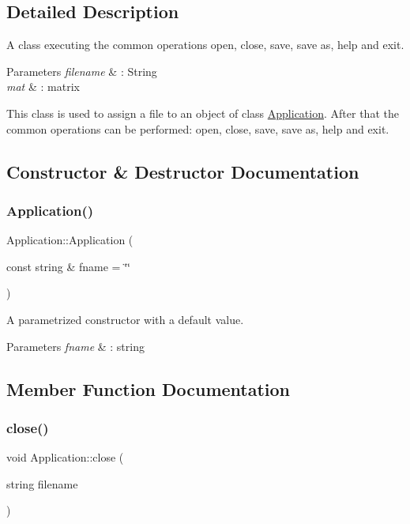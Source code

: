 \subsection{Detailed Description}
A class executing the common operations open, close, save, save as, help and exit. 


\begin{DoxyParams}{Parameters}
{\em filename} & \+: String \\
\hline
{\em mat} & \+: matrix\\
\hline
\end{DoxyParams}
This class is used to assign a file to an object of class \hyperlink{class_application}{Application}. After that the common operations can be performed\+: open, close, save, save as, help and exit. 

\subsection{Constructor \& Destructor Documentation}
\mbox{\label{class_application_ade4650e7378dae1d94794b86995fd571}} 
\subsubsection{\texorpdfstring{Application()}{Application()}}
{\footnotesize\ttfamily Application\+::\+Application (\begin{DoxyParamCaption}\item[{const string \&}]{fname = {\ttfamily \char`\"{}\char`\"{}} }\end{DoxyParamCaption})}

A parametrized constructor with a default value. 
\begin{DoxyParams}{Parameters}
{\em fname} & \+: string \\
\hline
\end{DoxyParams}


\subsection{Member Function Documentation}
\mbox{\label{class_application_a9909c3ed5d2e36680b8de11b21925bd5}} 
\subsubsection{\texorpdfstring{close()}{close()}}
{\footnotesize\ttfamily void Application\+::close (\begin{DoxyParamCaption}\item[{string}]{filename }\end{DoxyParamCaption})}

